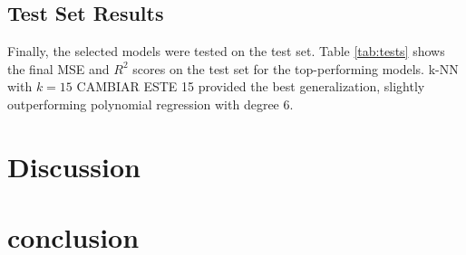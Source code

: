 \documentclass[twocolumn]{article}
\begin{document}


\subsection{Test Set Results}
Finally, the selected models were tested on the test set. Table \ref{tab:tests} shows the final MSE and \( R^2 \) scores on the test set 
for the top-performing models. k-NN with \(k=15\) CAMBIAR ESTE 15 provided the best generalization, 
slightly outperforming polynomial regression with degree 6.



\section{Discussion}


\section{conclusion}
\end{document}
